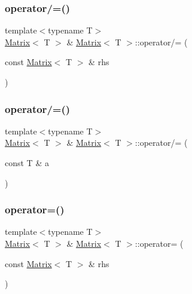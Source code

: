 \mbox{\label{classMatrix_aab1b305350c7547ee31f0eeb92fc8c4a}} 
\subsubsection{\texorpdfstring{operator/=()}{operator/=()}\hspace{0.1cm}{\footnotesize\ttfamily [1/2]}}
{\footnotesize\ttfamily template$<$typename T$>$ \\
\mbox{\hyperlink{classMatrix}{Matrix}}$<$ T $>$ \& \mbox{\hyperlink{classMatrix}{Matrix}}$<$ T $>$\+::operator/= (\begin{DoxyParamCaption}\item[{const \mbox{\hyperlink{classMatrix}{Matrix}}$<$ T $>$ \&}]{rhs }\end{DoxyParamCaption})\hspace{0.3cm}{\ttfamily [inline]}}

\mbox{\label{classMatrix_ada3039797826038262e03da2ee3a8697}} 
\subsubsection{\texorpdfstring{operator/=()}{operator/=()}\hspace{0.1cm}{\footnotesize\ttfamily [2/2]}}
{\footnotesize\ttfamily template$<$typename T$>$ \\
\mbox{\hyperlink{classMatrix}{Matrix}}$<$ T $>$ \& \mbox{\hyperlink{classMatrix}{Matrix}}$<$ T $>$\+::operator/= (\begin{DoxyParamCaption}\item[{const T \&}]{a }\end{DoxyParamCaption})\hspace{0.3cm}{\ttfamily [inline]}}

\mbox{\label{classMatrix_a01990eb2552555d37c83272125be68e6}} 
\subsubsection{\texorpdfstring{operator=()}{operator=()}\hspace{0.1cm}{\footnotesize\ttfamily [1/2]}}
{\footnotesize\ttfamily template$<$typename T$>$ \\
\mbox{\hyperlink{classMatrix}{Matrix}}$<$ T $>$ \& \mbox{\hyperlink{classMatrix}{Matrix}}$<$ T $>$\+::operator= (\begin{DoxyParamCaption}\item[{const \mbox{\hyperlink{classMatrix}{Matrix}}$<$ T $>$ \&}]{rhs }\end{DoxyParamCaption})\hspace{0.3cm}{\ttfamily [inline]}}

